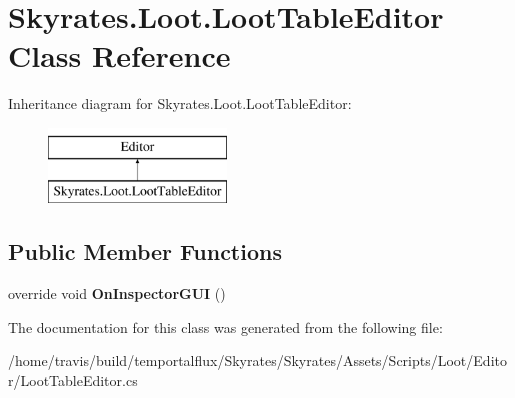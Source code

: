 \hypertarget{class_skyrates_1_1_loot_1_1_loot_table_editor}{\section{Skyrates.\-Loot.\-Loot\-Table\-Editor Class Reference}
\label{class_skyrates_1_1_loot_1_1_loot_table_editor}
}
Inheritance diagram for Skyrates.\-Loot.\-Loot\-Table\-Editor\-:\begin{figure}[H]
\begin{center}
\leavevmode
\includegraphics[height=2.000000cm]{class_skyrates_1_1_loot_1_1_loot_table_editor}
\end{center}
\end{figure}
\subsection*{Public Member Functions}
\begin{DoxyCompactItemize}
\item 
\hypertarget{class_skyrates_1_1_loot_1_1_loot_table_editor_aab371132cb8425f4c2269a465ef24979}{override void {\bfseries On\-Inspector\-G\-U\-I} ()}\label{class_skyrates_1_1_loot_1_1_loot_table_editor_aab371132cb8425f4c2269a465ef24979}

\end{DoxyCompactItemize}


The documentation for this class was generated from the following file\-:\begin{DoxyCompactItemize}
\item 
/home/travis/build/temportalflux/\-Skyrates/\-Skyrates/\-Assets/\-Scripts/\-Loot/\-Editor/Loot\-Table\-Editor.\-cs\end{DoxyCompactItemize}
